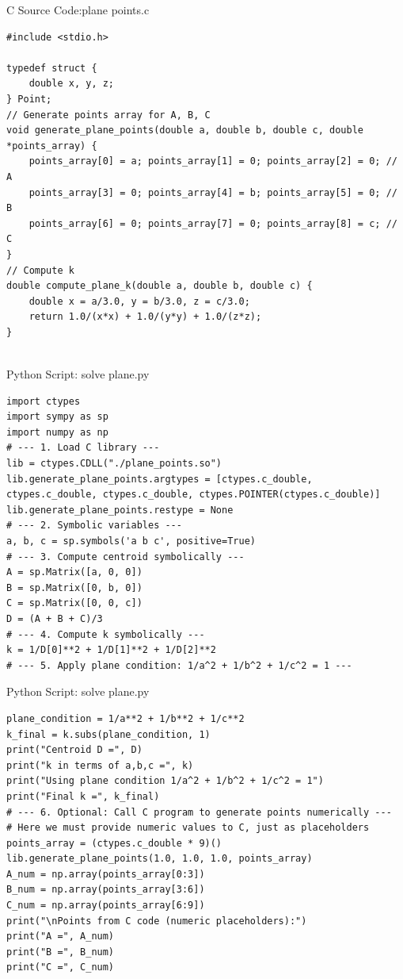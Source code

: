 \documentclass{beamer}
\numberwithin{equation}{section}
\theoremstyle{remark}
\begin{document}
\begin{frame}[fragile]{C Source Code:plane points.c}
\begin{verbatim}
#include <stdio.h>

typedef struct {
    double x, y, z;
} Point;
// Generate points array for A, B, C
void generate_plane_points(double a, double b, double c, double *points_array) {
    points_array[0] = a; points_array[1] = 0; points_array[2] = 0; // A
    points_array[3] = 0; points_array[4] = b; points_array[5] = 0; // B
    points_array[6] = 0; points_array[7] = 0; points_array[8] = c; // C
}
// Compute k
double compute_plane_k(double a, double b, double c) {
    double x = a/3.0, y = b/3.0, z = c/3.0;
    return 1.0/(x*x) + 1.0/(y*y) + 1.0/(z*z);
}


\end{verbatim}
\end{frame}

\begin{frame}[fragile]{Python Script:  solve plane.py}
\begin{verbatim}
import ctypes
import sympy as sp
import numpy as np
# --- 1. Load C library ---
lib = ctypes.CDLL("./plane_points.so")
lib.generate_plane_points.argtypes = [ctypes.c_double, ctypes.c_double, ctypes.c_double, ctypes.POINTER(ctypes.c_double)]
lib.generate_plane_points.restype = None
# --- 2. Symbolic variables ---
a, b, c = sp.symbols('a b c', positive=True)
# --- 3. Compute centroid symbolically ---
A = sp.Matrix([a, 0, 0])
B = sp.Matrix([0, b, 0])
C = sp.Matrix([0, 0, c])
D = (A + B + C)/3
# --- 4. Compute k symbolically ---
k = 1/D[0]**2 + 1/D[1]**2 + 1/D[2]**2
# --- 5. Apply plane condition: 1/a^2 + 1/b^2 + 1/c^2 = 1 ---
\end{verbatim}
\end{frame}
\begin{frame}[fragile]{Python Script:  solve plane.py}
\begin{verbatim}
plane_condition = 1/a**2 + 1/b**2 + 1/c**2
k_final = k.subs(plane_condition, 1)
print("Centroid D =", D)
print("k in terms of a,b,c =", k)
print("Using plane condition 1/a^2 + 1/b^2 + 1/c^2 = 1")
print("Final k =", k_final)
# --- 6. Optional: Call C program to generate points numerically ---
# Here we must provide numeric values to C, just as placeholders
points_array = (ctypes.c_double * 9)()
lib.generate_plane_points(1.0, 1.0, 1.0, points_array)
A_num = np.array(points_array[0:3])
B_num = np.array(points_array[3:6])
C_num = np.array(points_array[6:9])
print("\nPoints from C code (numeric placeholders):")
print("A =", A_num)
print("B =", B_num)
print("C =", C_num)
\end{verbatim}
\end{frame}
\end{document}
